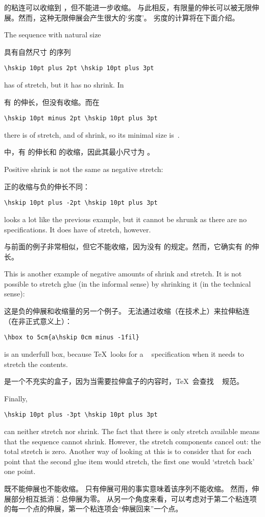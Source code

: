 的粘连可以收缩到 \n{2pt}，但不能进一步收缩。
与此相反，有限量的伸长可以被无限伸展。然而，这种无限伸展会产生很大的`劣度'。
劣度的计算将在下面介绍。

\begin{example}
The sequence with natural size \n{20pt}

具有自然尺寸 \n{20pt} 的序列
\begin{verbatim}
\hskip 10pt plus 2pt \hskip 10pt plus 3pt
\end{verbatim}
has \n{5pt} of stretch, but it has no shrink. In

有 \n{5pt} 的伸长，但没有收缩。而在
\begin{verbatim}
\hskip 10pt minus 2pt \hskip 10pt plus 3pt
\end{verbatim}
there is \n{3pt} of stretch, and \n{2pt} of shrink,
so its minimal size is~\n{18pt}. 

中，有 \n{3pt} 的伸长和 \n{2pt} 的收缩，因此其最小尺寸为 \n{18pt}。

Positive shrink is not the same as negative stretch:

正的收缩与负的伸长不同：
\begin{verbatim}
\hskip 10pt plus -2pt \hskip 10pt plus 3pt
\end{verbatim}
looks a lot like the previous example, but it cannot
be shrunk as there are no \hbox{}
specifications. It does have \n{1pt} of stretch, however.

与前面的例子非常相似，但它不能收缩，因为没有 \hbox{} 的规定。然而，它确实有 \n{1pt} 的伸长。

This is another example of negative amounts of shrink and stretch.
It is not possible to stretch
glue (in the informal sense) by shrinking it (in the technical
sense): 

这是负的伸展和收缩量的另一个例子。
无法通过收缩（在技术上）来拉伸粘连（在非正式意义上）：\begin{verbatim}
\hbox to 5cm{a\hskip 0cm minus -1fil}
\end{verbatim}
is an underfull box, because \TeX\ looks for a ~
specification when it needs to stretch the contents.

是一个不充实的盒子，因为当需要拉伸盒子的内容时，\TeX\ 会查找 ~ 规范。

Finally, \begin{verbatim}
\hskip 10pt plus -3pt \hskip 10pt plus 3pt
\end{verbatim}
can neither stretch nor shrink.
The fact that there is only stretch
available means that the sequence cannot
shrink. However, the stretch components cancel out: the 
total stretch is zero. Another way of looking at this
is to consider that for each point that the second glue item would
stretch, the first one would `stretch back' one point.

既不能伸展也不能收缩。
只有伸展可用的事实意味着该序列不能收缩。
然而，伸展部分相互抵消：总伸展为零。
从另一个角度来看，可以考虑对于第二个粘连项的每一个点的伸展，第一个粘连项会“伸展回来”一个点。
\end{example}

